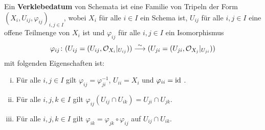 \begin{defn}
\label{defn:5.9}
	Ein \textbf{Verklebedatum} von Schemata ist eine Familie von Tripeln der Form $(X_i,U_{ij},\varphi_{ij})_{i,j\in I}$, wobei $X_i$ für alle $i \in I$ ein Schema ist, $U_{ij}$ für alle $i,j \in I$ eine offene Teilmenge von $X_i$ ist und $\varphi_{ij}$ für alle $i,j \in I$ ein Isomorphismus
	\[
		\varphi_{ij} \colon (U_{ij}=(U_{ij},\mathcal{O}_{X_i}\vert_{U_{ij}})) \overset{\sim}{\longrightarrow} (U_{ji}=(U_{ji},\mathcal{O}_{X_j}\vert_{U_{ji}}))
	\]
	mit folgenden Eigenschaften ist:
	\begin{enumerate}[i)]
		\item Für alle $i,j \in I$ gilt $\varphi_{ij} = \varphi^{-1}_{ji}$, $U_{ii} = X_i$ und $\varphi_{ii}= \operatorname{id}$ .
		\item Für alle $i,j,k \in I$ gilt $\varphi_{ij}(U_{ij}\cap U_{ik}) = U_{ji} \cap U_{jk}$.
		\item Für alle $i,j,k \in I$ gilt $\varphi_{ik} = \varphi_{jk}\circ \varphi_{ij}$ auf $U_{ij} \cap U_{ik}$.
	\end{enumerate}
\end{defn}

